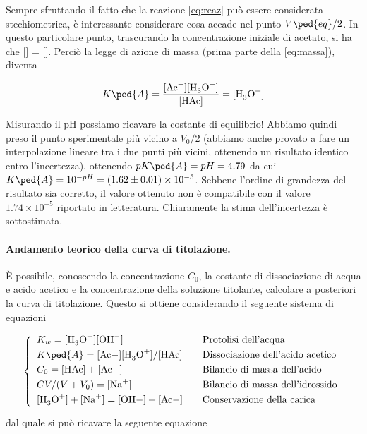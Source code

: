 Sempre sfruttando il fatto che la reazione \eqref{eq:reaz} può essere considerata stechiometrica,
è interessante considerare cosa accade nel punto $V\ped{eq}/2$. In questo particolare punto,
trascurando la concentrazione iniziale di acetato, si ha che [] = [].
Perciò la legge di azione di massa (prima parte della \eqref{eq:massa}), diventa 

\begin{equation}
    K\ped{A} = \frac{[\ce{Ac-}][\ce{H3O+}]}{[\ce{HAc}]} = [\ce{H3O+}]
\end{equation}

Misurando il pH possiamo ricavare la costante di equilibrio! Abbiamo quindi preso il punto sperimentale
più vicino a $V_0/2$ (abbiamo anche provato a fare un interpolazione lineare tra i due punti più
vicini, ottenendo un risultato identico entro l'incertezza), ottenendo $pK\ped{A} = pH = 4.79$ da cui
$K\ped{A} = 10^{-pH} = (1.62 \pm 0.01) \times 10^{-5}$. Sebbene l'ordine di grandezza del risultato sia corretto, il valore ottenuto non è compatibile con il valore $1.74 \times 10^{-5}$ riportato in letteratura.
Chiaramente la stima dell'incertezza è sottostimata.

\paragraph{Andamento teorico della curva di titolazione.}

È possibile, conoscendo la concentrazione $C_0$, la costante di dissociazione di
acqua e acido acetico e la concentrazione della soluzione titolante,
calcolare a posteriori la curva di titolazione.
Questo si ottiene considerando il seguente sistema di equazioni

\begin{equation}
    \left\{
    \begin{array}{l @\qquad l} \smallskip
        K_w = [\ce{H3O+}][\ce{OH-}] & \text{Protolisi dell'acqua} \\ \smallskip
        K\ped{A} = [\ce{Ac-]}[\ce{H3O+}]/[\ce{HAc}] & \text{Dissociazione dell'acido acetico} \\ \smallskip
        C_0 = \ce{[HAc] + [Ac-]} & \text{Bilancio di massa dell'acido} \\ \smallskip
        CV/(V + V_0) = [\ce{Na+}] & \text{Bilancio di massa dell'idrossido} \\ \smallskip
        \ce{[H3O+] + [Na+] = [OH-] + [Ac-]} & \text{Conservazione della carica} \\
    \end{array}
    \right.
    \label{eq:sistemone}
\end{equation}
%
dal quale si può ricavare la seguente equazione

